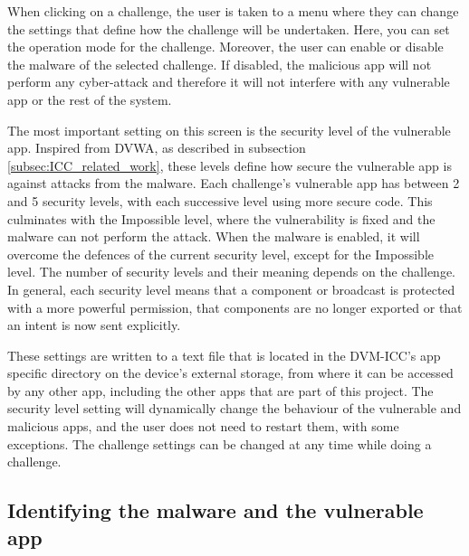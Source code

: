     When clicking on a challenge, the user is taken to a menu where they can change the settings that define how the challenge will be undertaken. Here, you can set the operation mode for the challenge. Moreover, the user can enable or disable the malware of the selected challenge. If disabled, the malicious app will not perform any cyber-attack and therefore it will not interfere with any vulnerable app or the rest of the system.
    
    The most important setting on this screen is the security level of the vulnerable app. Inspired from DVWA, as described in subsection \ref{subsec:ICC_related_work}, these levels define how secure the vulnerable app is against attacks from the malware. Each challenge's vulnerable app has between 2 and 5 security levels, with each successive level using more secure code. This culminates with the Impossible level, where the vulnerability is fixed and the malware can not perform the attack. When the malware is enabled, it will overcome the defences of the current security level, except for the Impossible level. The number of security levels and their meaning depends on the challenge. In general, each security level means that a component or broadcast is protected with a more powerful permission, that components are no longer exported or that an intent is now sent explicitly. 
    
    These settings are written to a text file that is located in the DVM-ICC's app specific directory on the device's external storage, from where it can be accessed by any other app, including the other apps that are part of this project. The security level setting will dynamically change the behaviour of the vulnerable and malicious apps, and the user does not need to restart them, with some
    exceptions. The challenge settings can be changed at any time while doing a challenge.
    
    \subsection{Identifying the malware and the vulnerable app}
        \label{subsec:identify_challenge_apps}
        
